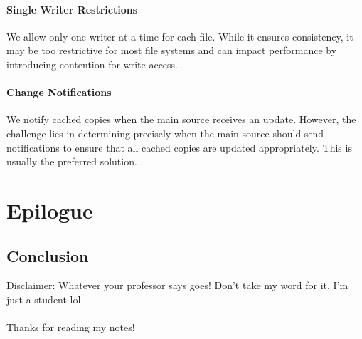 \documentclass{report}
\begin{document}
\subsection{Single Writer Restrictions}
We allow only one writer at a time for each file. While it ensures consistency, it may be too
restrictive for most file systems and can impact performance by introducing contention for write
access. 


\subsection{Change Notifications}
We notify cached copies when the main source receives an update. However, the
challenge lies in determining precisely when the main source should send notifications to ensure
that all cached copies are updated appropriately. This is usually the preferred solution.










\begingroup
\renewcommand\thepart{\Alph{part}.} %
\part{Epilogue}
\endgroup
\chapter{Conclusion}
Disclaimer: Whatever your professor says goes! Don't take my word for it, I'm just a student
lol. \\ \\
Thanks for reading my notes!
\end{document}
